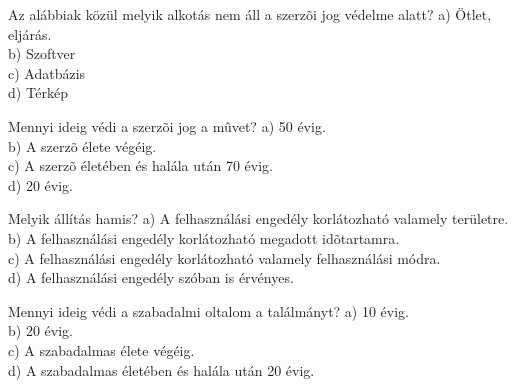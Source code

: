 \begin{frame}

\begin{tcolorbox}[title={180. Kérdés}]
Az alábbiak közül melyik alkotás nem áll a szerzõi jog védelme alatt?
\tcblower
a) Ötlet, eljárás.\\
b) Szoftver\\
c) Adatbázis\\
d) Térkép
\end{tcolorbox}

\begin{tcolorbox}[title={181. Kérdés}]
Mennyi ideig védi a szerzõi jog a mûvet?
\tcblower
a) 50 évig.\\
b) A szerzõ élete végéig.\\
c) A szerzõ életében és halála után 70 évig.\\
d) 20 évig.
\end{tcolorbox}

\begin{tcolorbox}[title={182. Kérdés}]
Melyik állítás hamis?
\tcblower
a) A felhasználási engedély korlátozható valamely területre.\\
b) A felhasználási engedély korlátozható megadott idõtartamra.\\
c) A felhasználási engedély korlátozható valamely felhasználási módra.\\
d) A felhasználási engedély szóban is érvényes.
\end{tcolorbox}

\begin{tcolorbox}[title={183. Kérdés}]
Mennyi ideig védi a szabadalmi oltalom a találmányt?
\tcblower
a) 10 évig.\\
b) 20 évig.\\
c) A szabadalmas élete végéig.\\
d) A szabadalmas életében és halála után 20 évig.
\end{tcolorbox}

\end{frame}


